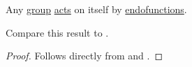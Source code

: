 \begin{theorem}\label{thm:cayleys_theorem}
  Any \hyperref[def:group]{group} \hyperref[def:left_group_action]{acts} on itself by \hyperref[def:endofunction]{endofunctions}.

  Compare this result to .
\end{theorem}
\begin{proof}
  Follows directly from  and .
\end{proof}
